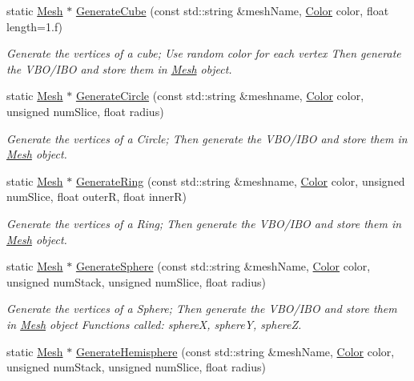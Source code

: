 \begin{DoxyCompactItemize}
static \hyperlink{class_mesh}{Mesh} $\ast$ \hyperlink{class_mesh_builder_a82d1778f4dc20e207d0e3158864c5f30}{Generate\+Cube} (const std\+::string \&mesh\+Name, \hyperlink{struct_color}{Color} color, float length=1.f)
\begin{DoxyCompactList}\small\item\em Generate the vertices of a cube; Use random color for each vertex Then generate the V\+B\+O/\+I\+B\+O and store them in \hyperlink{class_mesh}{Mesh} object. \end{DoxyCompactList}\item 
static \hyperlink{class_mesh}{Mesh} $\ast$ \hyperlink{class_mesh_builder_ab0c53a2d6f45d6cde847797839b3a2f5}{Generate\+Circle} (const std\+::string \&meshname, \hyperlink{struct_color}{Color} color, unsigned num\+Slice, float radius)
\begin{DoxyCompactList}\small\item\em Generate the vertices of a Circle; Then generate the V\+B\+O/\+I\+B\+O and store them in \hyperlink{class_mesh}{Mesh} object. \end{DoxyCompactList}\item 
static \hyperlink{class_mesh}{Mesh} $\ast$ \hyperlink{class_mesh_builder_a7bd766a7fb3be078327b66b271018e9e}{Generate\+Ring} (const std\+::string \&meshname, \hyperlink{struct_color}{Color} color, unsigned num\+Slice, float outer\+R, float inner\+R)
\begin{DoxyCompactList}\small\item\em Generate the vertices of a Ring; Then generate the V\+B\+O/\+I\+B\+O and store them in \hyperlink{class_mesh}{Mesh} object. \end{DoxyCompactList}\item 
static \hyperlink{class_mesh}{Mesh} $\ast$ \hyperlink{class_mesh_builder_a10f627b0355a031b42d0337e95d2af56}{Generate\+Sphere} (const std\+::string \&mesh\+Name, \hyperlink{struct_color}{Color} color, unsigned num\+Stack, unsigned num\+Slice, float radius)
\begin{DoxyCompactList}\small\item\em Generate the vertices of a Sphere; Then generate the V\+B\+O/\+I\+B\+O and store them in \hyperlink{class_mesh}{Mesh} object Functions called\+: sphere\+X, sphere\+Y, sphere\+Z. \end{DoxyCompactList}\item 
static \hyperlink{class_mesh}{Mesh} $\ast$ \hyperlink{class_mesh_builder_a0c4ccf0ee38c03b70cfe76443cacc543}{Generate\+Hemisphere} (const std\+::string \&mesh\+Name, \hyperlink{struct_color}{Color} color, unsigned num\+Stack, unsigned num\+Slice, float radius)

\end{DoxyCompactItemize}
